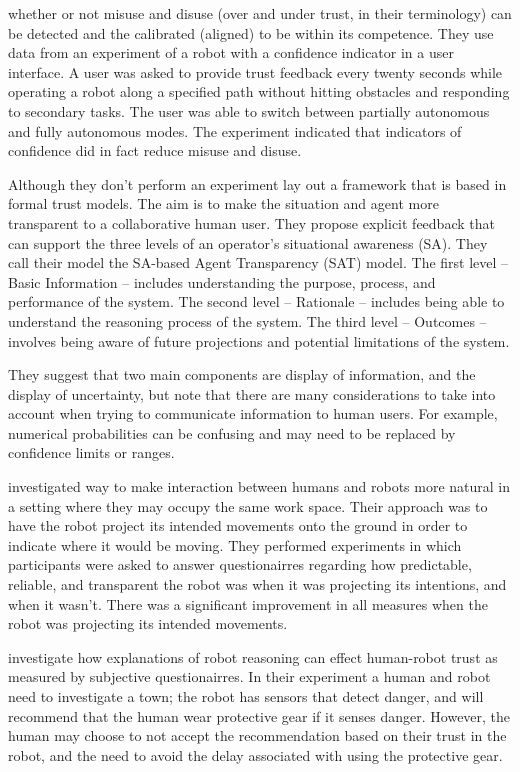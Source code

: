 \citet{Kaniarasu2013-ho} whether or not misuse and disuse (over and under trust, in their terminology) can be detected and the calibrated (aligned) to be within its competence. They use data from an experiment of a robot with a confidence indicator in a user interface. A user was asked to provide trust feedback every twenty seconds while operating a robot along a specified path without hitting obstacles and responding to secondary tasks. The user was able to switch between partially autonomous and fully autonomous modes. The experiment indicated that indicators of confidence did in fact reduce misuse and disuse.

Although they don't perform an experiment \citet{Chen2014-dk} lay out a framework that is based in formal trust models. The aim is to make the situation and agent more transparent to a collaborative human user. They propose explicit feedback that can support the three levels of an operator's situational awareness (SA). They call their model the SA-based Agent Transparency (SAT) model. The first level -- Basic Information -- includes understanding the purpose, process, and performance of the system. The second level -- Rationale -- includes being able to understand the reasoning process of the system. The third level -- Outcomes -- involves being aware of future projections and potential limitations of the system. 

They suggest that two main components are display of information, and the display of uncertainty, but note that there are many considerations to take into account when trying to communicate information to human users. For example, numerical probabilities can be confusing and may need to be replaced by confidence limits or ranges.

\citet{Chadalavada2015-wx} investigated way to make interaction between humans and robots more natural in a setting where they may occupy the same work space. Their approach was to have the robot project its intended movements onto the ground in order to indicate where it would be moving. They performed experiments in which participants were asked to answer questionairres regarding how predictable, reliable, and transparent the robot was when it was projecting its intentions, and when it wasn't. There was a significant improvement in all measures when the robot was projecting its intended movements.

\citet{Wang2016-id} investigate how explanations of robot reasoning can effect human-robot trust as measured by subjective questionairres. In their experiment a human and robot need to investigate a town; the robot has sensors that detect danger, and will recommend that the human wear protective gear if it senses danger. However, the human may choose to not accept the recommendation based on their trust in the robot, and the need to avoid the delay associated with using the protective gear.


